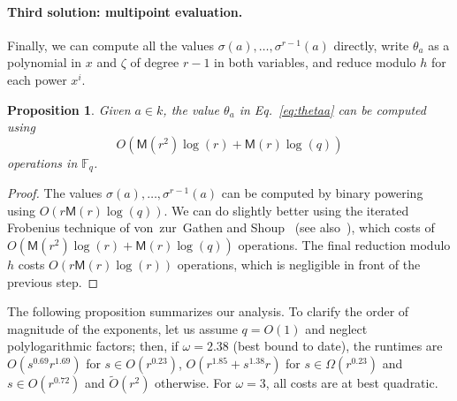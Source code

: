 \documentclass[12pt]{article}
\theoremstyle{plain}
\newtheorem{proposition}[theorem]{Proposition}
\theoremstyle{definition}
\newcommand{\tildO}{\tilde{O}}
\def\F{\ensuremath{\mathbb{F}}}
\def\MM{\ensuremath{\mathsf{M}}}
\newcounter{algorithm}
\begin{document}
\paragraph{Third solution: multipoint evaluation.}
Finally, we can compute all the values
$\sigma(a),\dots,\sigma^{r-1}(a)$ directly, write $\theta_a$ as a
polynomial in $x$ and $\zeta$ of degree $r-1$ in both variables, and
reduce modulo $h$ for each power $x^i$.

\begin{proposition}
  \label{prop:iter-frob-theta}
  Given $a\in k$, the value $\theta_a$ in Eq.~\eqref{eq:thetaa} can
  be computed using 
  \[
O(\MM(r^2)\log(r) + \MM(r)\log(q))
\] operations in
  $\F_q$.
\end{proposition}
\begin{proof}
  The values $\sigma(a),\dots,\sigma^{r-1}(a)$ can be computed by
  binary powering using $O(r\MM(r)\log(q))$. %
  We can do slightly better using the iterated Frobenius technique of
  von~zur~Gathen and Shoup~\cite[Algorithm~3.1]{von1992computing} (see
  also~\cite[Ch.~14.7]{vzGG}), which costs of
  $O(\MM(r^2)\log(r) + \MM(r)\log(q))$ operations. %
  The final reduction modulo $h$ costs $O(r\MM(r)\log(r))$ operations,
  which is negligible in front of the previous step.
\end{proof}


The following proposition summarizes our analysis. To clarify the
order of magnitude of the exponents, let us assume $q=O(1)$ and
neglect polylogarithmic factors; then, if $\omega=2.38$ (best bound to
date), the runtimes are $O(s^{0.69}r^{1.69})$ for $s \in O(r^{0.23})$,
$O(r^{1.85}+s^{1.38}r)$ for $s \in \Omega(r^{0.23})$ and $s\in
O(r^{0.72})$ and $\tildO(r^2)$ otherwise.
For $\omega=3$, all costs are at best quadratic.
\end{document}
